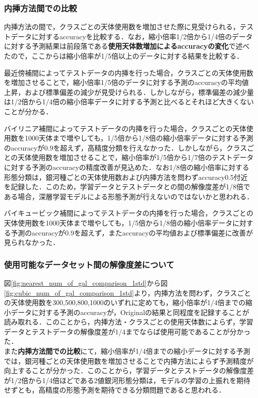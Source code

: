 \documentclass[a4j, 11pt]{jreport}
\begin{document}
\subsubsection{内挿方法間での比較}
内挿方法の間で，クラスごとの天体使用数を増加させた際に見受けられる，テストデータに対するaccuracyを比較する．なお，縮小倍率1/2倍から1/4倍のデータに対する予測結果は前段落である\textbf{使用天体数増加によるaccuracyの変化}で述べたので，ここからは縮小倍率が1/5倍以上のデータに対する結果を比較する．

最近傍補間によってテストデータの内挿を行った場合，クラスごとの天体使用数を増加させることで，縮小倍率1/5倍のデータに対する予測のaccuracyの平均値上昇，および標準偏差の減少が見受けられる．しかしながら，標準偏差の減少量は1/2倍から1/4倍の縮小倍率データに対する予測と比べるとそれほど大きくないことが分かる．

バイリニア補間によってテストデータの内挿を行った場合，クラスごとの天体使用数を1000天体まで増やしても，1/5倍から1/8倍の縮小倍率データに対する予測のaccuracyが0.9を超えず，高精度分類を行えなかった．しかしながら，クラスごとの天体使用数を増加させることで，縮小倍率が1/5倍から1/7倍のテストデータに対する予測のaccuracyの精度改善が見込めた．なお1/8倍の縮小倍率に対する形態分類は，銀河種ごとの天体使用数および内挿方法を問わずaccuracy0.5付近を記録した．このため，学習データとテストデータとの間の解像度差が1/8倍である場合，深層学習モデルによる形態予測が行えないのではないかと思われる．

バイキュービック補間によってテストデータの内挿を行った場合，クラスごとの天体使用数を1000天体まで増やしても，1/5倍から1/8倍の縮小倍率データに対する予測のaccuracyが0.9を超えず，またaccuracyの平均値および標準偏差に改善が見られなかった．

\subsubsection{使用可能なデータセット間の解像度差について}
図\ref{fig:nearest_num_of_gal_comparison_1std}から図\ref{fig:cubic_num_of_gal_comparison_1std}より，内挿方法を問わず，クラスごとの天体使用数を300,500,800,1000のいずれに定めても，縮小倍率が1/4倍までの縮小データに対する予測のaccuracyが，Originalの結果と同程度を記録することが読み取れる．このことから，内挿方法・クラスごとの使用天体数によらず，学習データとテストデータの解像度差が1/4までならば使用可能であることが分かった．
\\また\textbf{内挿方法間での比較}にて，縮小倍率が1/4倍までの縮小データに対する予測では，銀河種ごとの天体使用数を増加させることで内挿方法によらず予測精度が向上することが分かった．このことから，学習データとテストデータの解像度差が1/2倍から1/4倍ほどである2値銀河形態分類は，モデルの学習の上振れを期待せずとも，高精度の形態予測を期待できる分類問題であると思われる．
\end{document}
